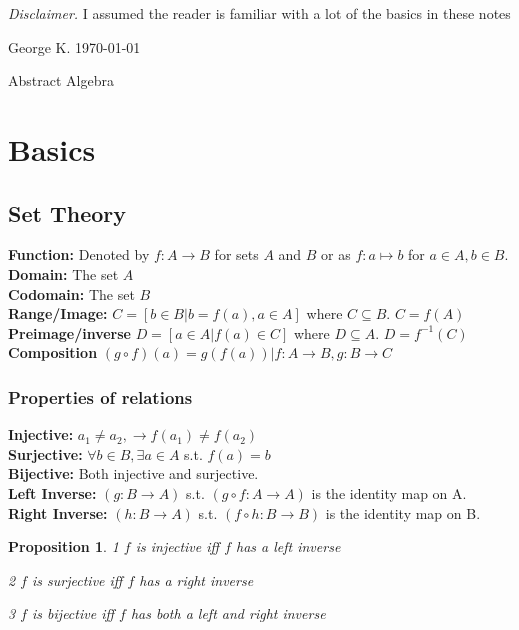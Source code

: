 \documentclass[12pt]{article}
\let\to=\rightarrow
\newcommand{\dis}[1]{\begin{mdframed}\emph{Disclaimer.} #1\end{mdframed}}
\newtheorem{proposition}{Proposition}
\begin{document}
\thispagestyle{empty}
\color{blue}
\tableofcontents

\dis{I assumed the reader is familiar with a lot of the basics in these notes}
\color{black}
\clearpage
\pagestyle{fancy}

\noindent George K. \hfill \today

\begin{center}
{\large Abstract Algebra}
\end{center}

\section{Basics}
\subsection{Set Theory}

\textbf{Function:} Denoted by $f: A \rightarrow B$ for sets $A$ and $B$ or as $f: a \mapsto b$ for $a \in A,b \in B. $ \\
\textbf{Domain:}  The set $A$ \\
\textbf{Codomain:}  The set $B$\\
\textbf{Range/Image:} $C = [b \in B | b = f(a), a \in A]$ where $C \subseteq B$. $ C = f(A)$\\
\textbf{Preimage/inverse} $D = [a \in A | f(a) \in C]$ where $D \subseteq A$. $ D = f^{-1} (C)$\\
\textbf{Composition} $(g \circ f)(a) = g(f(a)) | f: A \to B, g: B \to C $

\subsubsection{Properties of relations}
\textbf{Injective:} $a_1 \neq a_2, \to f(a_1) \neq f(a_2)$ \\
\textbf{Surjective:} $\forall b \in B, \exists a \in A$ s.t. $f(a) = b $ \\
\textbf{Bijective:} Both injective and surjective.\\
\textbf{Left Inverse:} $(g: B \to A)$ s.t. $ (g \circ f: A \to A)$ is the identity map on A.\\
\textbf{Right Inverse:} $(h: B \to A)$ s.t. $ (f \circ h: B \to B)$ is the identity map on B.\\

\begin{proposition}
\item[1] $f$ is injective iff $f$ has a left inverse
\item[2] $f$ is surjective iff $f$ has a right inverse
\item[3] $f$ is bijective iff $f$ has both a left and right inverse
\end{proposition}
\end{document}
